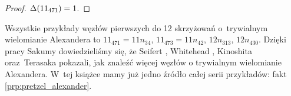 \begin{proof}
    $\Delta(11_{471}) = 1$.
\end{proof}

Wszystkie przykłady węzłów pierwszych do 12 skrzyżowań o~trywialnym wielomianie Alexandera to $11_{471} = 11n_{34}$, $11_{473} = 11n_{42}$, $12n_{313}$, $12n_{430}$.
Dzięki pracy Sakumy \cite{sakuma20} dowiedzieliśmy się, że Seifert \cite{seifert35}, Whitehead \cite{whitehead37}, Kinoshita oraz~Terasaka \cite{kinoshita57} pokazali, jak znaleźć więcej węzłów o trywialnym wielomianie Alexandera.
%
%
%
%
%
W~tej książce mamy już jedno źródło całej serii przykładów: fakt \ref{prp:pretzel_alexander}.


